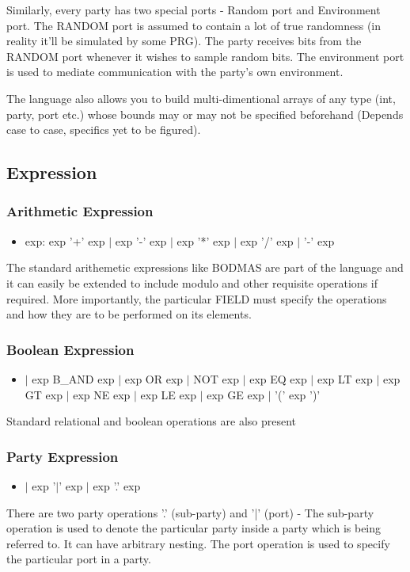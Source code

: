 Similarly, every party has two special ports - Random port and Environment port. The RANDOM port is assumed to contain a lot of true randomness (in reality it'll be simulated by some PRG). The party receives bits from the RANDOM port whenever it wishes to sample random bits. The environment port is used to mediate communication with the party's own environment.

The language also allows you to build multi-dimentional arrays of any type (int, party, port etc.) whose bounds may or may not be specified beforehand (Depends case to case, specifics yet to be figured).

\subsection{Expression}

\subsubsection{Arithmetic Expression}
\begin{itemize}
\item exp: exp '+' exp $|$ exp '-' exp $|$ exp '*' exp $|$ exp '/' exp $|$ '-' exp
\end{itemize}

The standard arithemetic expressions like BODMAS are part of the language and it can easily be extended to include modulo and other requisite operations if required. More importantly, the particular FIELD must specify the operations and how they are to be performed on its elements.

\subsubsection{Boolean Expression}
\begin{itemize}
\item $|$ exp B\_AND exp $|$ exp OR exp $|$ NOT exp $|$ exp EQ exp $|$ exp LT exp $|$ exp GT exp $|$ exp NE exp $|$ exp LE exp $|$ exp GE exp $|$ '(' exp ')'

\end{itemize}

Standard relational and boolean operations are also present

\subsubsection{Party Expression}
\begin{itemize}
\item $|$ exp '$|$' exp $|$ exp '.' exp
\end{itemize}
There are two party operations '.' (sub-party) and '|' (port) - The sub-party operation is used to denote the particular party inside a party which is being referred to. It can have arbitrary nesting. The port operation is used to specify the particular port in a party.

